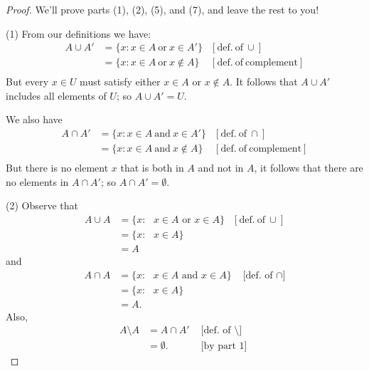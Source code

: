 %
%
%
\begin{proof}
We'll prove parts (1), (2), (5), and (7), and leave the rest to you!

\noindent
(1)
From our definitions we have:
\begin{align*}
A \cup A' & =  \{ x : x \in A \mathrm{~or~} x \in A' \}  & [\mathrm{def.~of~} \cup ]\\
& =  \{ x : x \in A \mathrm{~or~} x \notin A \}  & [\mathrm{def.~of~complement} ]  \\
\end{align*}
But every $x \in U$ must satisfy either $x \in A$ or $x \notin A$. It follows that $A \cup A'$ includes all elements of $U$; so $A \cup A' = U$.

\noindent
We also have 
\begin{align*}
A \cap A' & =  \{ x : x \in A \mathrm{~and~} x \in A' \}  & [\mathrm{def.~of~} \cap ]\\
& =  \{ x : x \in A \mathrm{~and~} x \notin A \}  & [\mathrm{def.~of~complement} ]  \\
\end{align*}
But there is no element $x$ that is both in $A$ and not in $A$, it follows that there are no elements in $A \cap A'$; so $A \cap A' = \emptyset$.

\noindent
(2)
Observe that
\begin{align*}
A \cup A & =  \{ x : \mbox{ $x \in A$ or $x \in A$} \}    & [\mathrm{def.~of~} \cup]  \\
& =  \{ x : \mbox{ $x \in A$} \} \\
& =  A
\end{align*}
and
\begin{align*}
A \cap A & =  \{ x : \mbox{ $x \in A$ and $x \in A$} \}    &\text{ [def. of } \cap] \\
& =  \{ x : \mbox{ $x \in A$}  \} \\
& =  A.
\end{align*}
Also, 
\begin{align*}
A \setminus A &= A \cap A'    &\mbox{ [def. of } \setminus] \\
&= \emptyset.    &\mbox{ [by part 1] }
\end{align*}


\end{proof}

